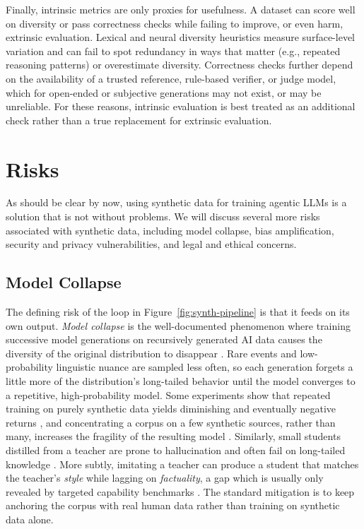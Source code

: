 Finally, intrinsic metrics are only proxies for usefulness. A dataset can score well on diversity or pass correctness checks while failing to improve, or even harm, extrinsic evaluation. Lexical and neural diversity heuristics measure surface-level variation and can fail to spot redundancy in  ways that matter (e.g., repeated reasoning patterns) or overestimate diversity. %
Correctness checks further depend on the availability of a trusted reference, rule-based verifier, or judge model, which for open-ended or subjective generations may not exist, or may be unreliable. For these reasons, intrinsic evaluation is best treated as an additional check  rather than a true replacement for extrinsic evaluation.




\section{Risks}
\label{sec:risks}

As should be clear by now, using synthetic data for training agentic LLMs is a solution that is not without problems. We will discuss  several more risks associated with synthetic data, including model collapse, bias amplification, security and privacy vulnerabilities, and legal and ethical concerns.

\subsection{Model Collapse}
The defining risk of the loop in Figure~\ref{fig:synth-pipeline} is that it feeds on its own output. \emph{Model collapse} is the well-documented phenomenon where training successive model generations on recursively generated AI data causes the diversity of the original distribution to disappear \citep{shumailov2024curserecursiontraininggenerated}. Rare events and low-probability linguistic nuance are sampled less often, so each generation forgets a little more of the distribution's long-tailed behavior until the model converges to a repetitive, high-probability model. Some experiments show that repeated training on purely synthetic data yields diminishing and eventually negative returns \citep{singh2024beyond}, and concentrating a corpus on a few synthetic sources, rather than many, increases the fragility of the resulting model \citep{schaffelder2025syntheticeggsbasketsimpact}. Similarly, small students distilled from a teacher are prone to hallucination and often fail on long-tailed knowledge \citep{pmlr-v202-kandpal23a}. More subtly, imitating a teacher can produce a student that matches the teacher's \emph{style} while lagging on \emph{factuality}, a gap which is usually only revealed by targeted capability benchmarks \citep{gudibande2023falsepromiseimitatingproprietary}. The standard mitigation is to keep anchoring the corpus with real human data rather than training on synthetic data alone.

